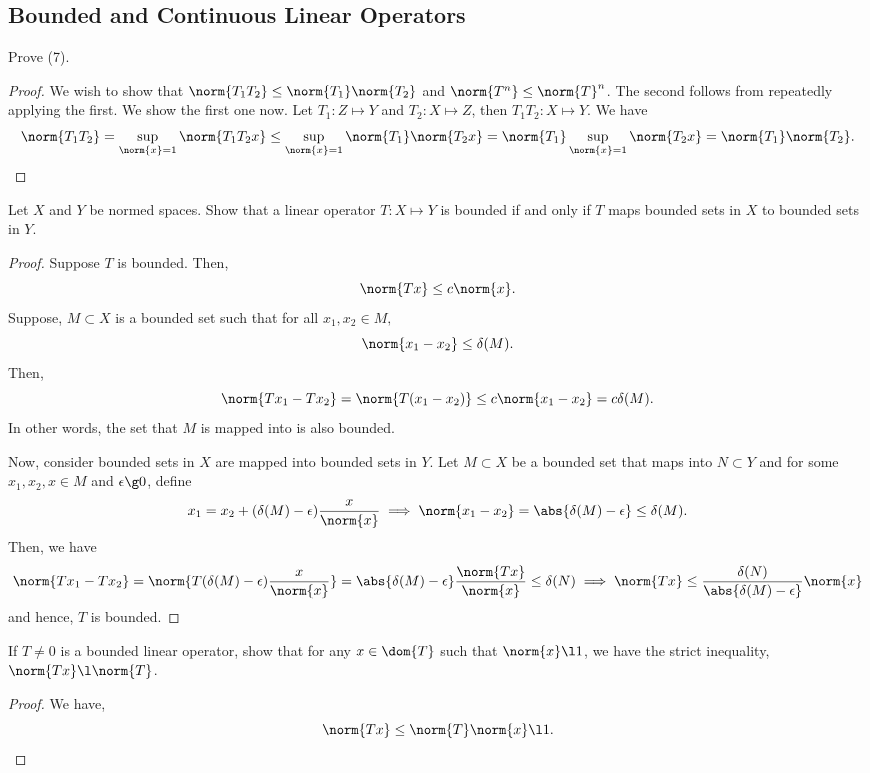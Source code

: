 \subsection{Bounded and Continuous Linear Operators}

\begin{question}
    Prove (7).
    \label{section2.7-1}
\end{question}
\begin{proof}
    We wish to show that $\norm{T_1T_2} \leq \norm{T_1}\norm{T_2}$ and $\norm{T^n} \leq \norm{T}^n$. The second follows from repeatedly applying the first. We show the first one now. Let $T_1 : Z \mapsto Y$ and $T_2 : X \mapsto Z$, then $T_1T_2 : X \mapsto Y$. We have
    \[\norm{T_1T_2} = \sup_{\norm{x} = 1} \norm{T_1T_2x} \leq \sup_{\norm{x} = 1} \norm{T_1}\norm{T_2x} =\norm{T_1}\sup_{\norm{x} = 1}\norm{T_2x} = \norm{T_1}\norm{T_2}.\]
\end{proof}

\begin{question}
    Let $X$ and $Y$ be normed spaces. Show that a linear operator $T:X \mapsto Y$ is bounded if and only if $T$ maps bounded sets in $X$ to bounded sets in $Y$.
    \label{section2.7-2}
\end{question}
\begin{proof}
    Suppose $T$ is bounded. Then,
    \[\norm{Tx} \leq c \norm{x}.\]
    Suppose, $M \subset X$ is a bounded set such that for all $x_1 , x_2 \in M, $
    \[\norm{x_1 - x_2} \leq \delta(M).\]
    Then, 
    \[\norm{Tx_1 - Tx_2} = \norm{T(x_1 - x_2)} \leq c \norm{x_1 - x_2} = c\delta(M).\]
    In other words, the set that $M$ is mapped into is also bounded.

    Now, consider bounded sets in $X$ are mapped into bounded sets in $Y$. Let $ M \subset X$ be a bounded set that maps into $N \subset Y$ and for some $x_1 ,x_2 , x \in M$ and $\epsilon \g 0$, define
    \[x_1 = x_2 + (\delta(M) - \epsilon)\frac{x}{\norm{x}} \implies \norm{x_1 - x_2} = \abs{\delta(M) - \epsilon} \leq \delta(M).\]
    Then, we have
    \[\norm{Tx_1 - Tx_2} = \norm{T(\delta(M) - \epsilon)\frac{x}{\norm{x}}} = \abs{\delta(M) - \epsilon} \frac{\norm{Tx}}{\norm{x}} \leq \delta(N) \implies \norm{Tx} \leq \frac{\delta(N)}{\abs{\delta(M) - \epsilon}} \norm{x}\]
    and hence, $T$ is bounded.
\end{proof}

\begin{question}
    If $T \neq 0$ is a bounded linear operator, show that for any $x \in \dom{T}$ such that $\norm{x} \l 1$, we have the strict inequality, $\norm{Tx} \l \norm{T}$.
    \label{section2.7-3}
\end{question}
\begin{proof}
    We have,
    \[\norm{Tx} \leq \norm{T} \norm{x} \l 1.\]
\end{proof}

